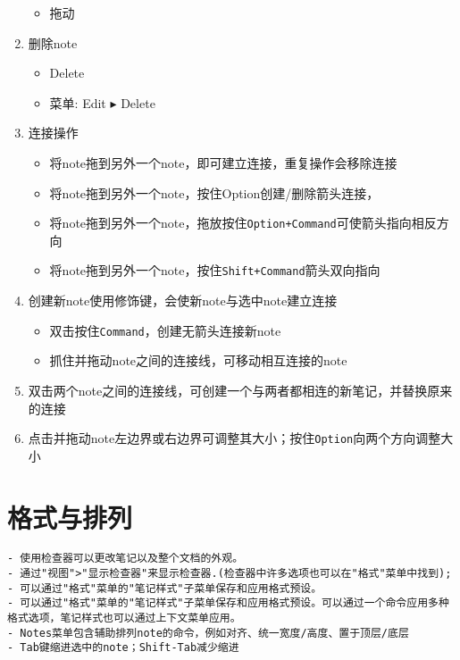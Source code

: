 \documentclass{../main.tex}{subfiles}
\begin{document}
\begin{enumerate}[itemsep=0pt, parsep=0pt, topsep=0pt, partopsep=0pt]
\begin{itemize}[itemsep=0pt, parsep=0pt, topsep=0pt, partopsep=0pt]
      \item 拖动
    \end{itemize}
  \item 删除note
    \begin{itemize}[itemsep=0pt, parsep=0pt, topsep=0pt, partopsep=0pt]
      \item Delete
      \item 菜单: Edit $\blacktriangleright$ Delete
    \end{itemize}
  \item 连接操作
    \begin{itemize}[itemsep=0pt, parsep=0pt, topsep=0pt, partopsep=0pt]
      \item 将note拖到另外一个note，即可建立连接，重复操作会移除连接
      \item 将note拖到另外一个note，按住Option创建/删除箭头连接，
      \item 将note拖到另外一个note，拖放按住\texttt{Option+Command}可使箭头指向相反方向
      \item 将note拖到另外一个note，按住\texttt{Shift+Command}箭头双向指向
    \end{itemize}
  \item 创建新note使用修饰键，会使新note与选中note建立连接
    \begin{itemize}[itemsep=0pt, parsep=0pt, topsep=0pt, partopsep=0pt]
      \item 双击按住\texttt{Command}，创建无箭头连接新note
      \item 抓住并拖动note之间的连接线，可移动相互连接的note
    \end{itemize}
  \item 双击两个note之间的连接线，可创建一个与两者都相连的新笔记，并替换原来的连接
  \item 点击并拖动note左边界或右边界可调整其大小；按住\texttt{Option}向两个方向调整大小
\end{enumerate}

\section{格式与排列}
\begin{lstlisting}[style=lstCodeStylePlainText]
- 使用检查器可以更改笔记以及整个文档的外观。
- 通过"视图">"显示检查器"来显示检查器.(检查器中许多选项也可以在"格式"菜单中找到);
- 可以通过"格式"菜单的"笔记样式"子菜单保存和应用格式预设。
- 可以通过"格式"菜单的"笔记样式"子菜单保存和应用格式预设。可以通过一个命令应用多种格式选项，笔记样式也可以通过上下文菜单应用。
- Notes菜单包含辅助排列note的命令，例如对齐、统一宽度/高度、置于顶层/底层
- Tab键缩进选中的note；Shift-Tab减少缩进
\end{lstlisting}
\end{document}
